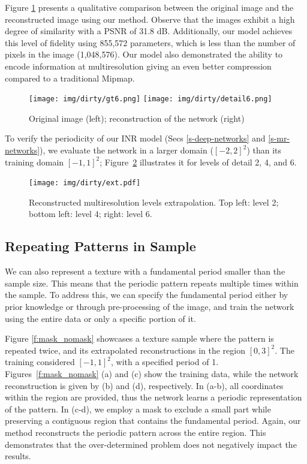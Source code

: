\vspace{-.7cm}

Figure \ref{f:rec_gt} presents a qualitative comparison between the original image and the reconstructed image using our method. 
Observe that the images exhibit a high degree of similarity with a PSNR of 31.8 dB.
Additionally, our model achieves this level of fidelity using 855,572 parameters, which is less than the number of pixels in the image (1,048,576). Our model also demonstrated the ability to encode information at multiresolution giving an even better compression compared to a traditional Mipmap.

\begin{figure}[h]
\centering
\texttt{[image: img/dirty/gt6.png]}
\texttt{[image: img/dirty/detail6.png]}
\vspace{-0.4cm}
\caption{Original image (left); reconstruction of the network (right) 
}
\label{f:rec_gt}
\end{figure}

To verify the periodicity of our INR model (Secs \ref{s-deep-networks} and \ref{s-mr-networks}), we evaluate the network in a larger domain ($[-2, 2]^2$) than its training domain $[-1, 1]^2$; Figure~\ref{f:mr-periodic} illustrates it for levels of detail 2, 4, and 6.

\begin{figure}[!h]
\centering
\texttt{[image: img/dirty/ext.pdf]}
\vspace{-0.4cm}
\caption{Reconstructed multiresolution levels extrapolation. Top left: level 2; bottom left: level 4; right: level 6.}
\label{f:mr-periodic}
\end{figure}

\subsection{Repeating Patterns in Sample}

We can also represent a texture with a fundamental period smaller than the sample size. 
This means that the periodic pattern repeats multiple times within the sample. 
To address this, we can specify the fundamental period either by prior knowledge or through pre-processing of the image, and train the network using the entire data or only a specific portion of it.

Figure \ref{f:mask_nomask} showcases a texture sample where the pattern is repeated twice, and its extrapolated reconstructions in the region $[0, 3]^2$. The training considered $[-1, 1]^2$, with a specified period of 1. 
Figures~\ref{f:mask_nomask} (a) and (c) show the training data, while the network reconstruction is given by (b) and (d), respectively. 
In (a-b), all coordinates within the region are provided, thus the network learns a periodic representation of the pattern. 
In (c-d), we employ a mask to exclude a small part while preserving a contiguous region that contains the fundamental period. Again, our method reconstructs the periodic pattern across the entire region. This demonstrates that the over-determined problem does not negatively impact the results. 

